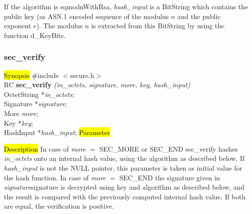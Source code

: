 If the algorithm is sqmodnWithRsa, {\em hash\_input} is a BitString which contains the 
public key (as ASN.1 encoded sequence of the modulus $n$ and the public
exponent $e$). The modulus $n$ is extracted from this BitString by using the function
d\_KeyBits.

\subsubsection{sec\_verify}
\label{sec_verify}
\hl{Synopsis}
\#include $<$secure.h$>$ \\ [0.5cm]
RC {\bf sec\_verify} {\em (in\_octets, signature, more, key, hash\_input)} \\
OctetString *{\em in\_octets}; \\
Signature *{\em signature}; \\
More {\em more}; \\
Key *{\em key}; \\
HashInput *{\em hash\_input};
\hl{Parameter}





\hl{Description}
In case of {\em more} $=$ SEC\_MORE or SEC\_END sec\_verify hashes {\em in\_octets} onto
an internal hash value, using the algorithm as described below.
If {\em hash\_input} is not the NULL pointer, this parameter is taken
as initial value for the hash function.
In case of {\em more} $=$ SEC\_END the signature given in {\em signature}\pf signature
is decrypted using key and algorithm as described below, and the result is compared
with the previously computed internal hash value. If both are equal, the verification
is positive. 

